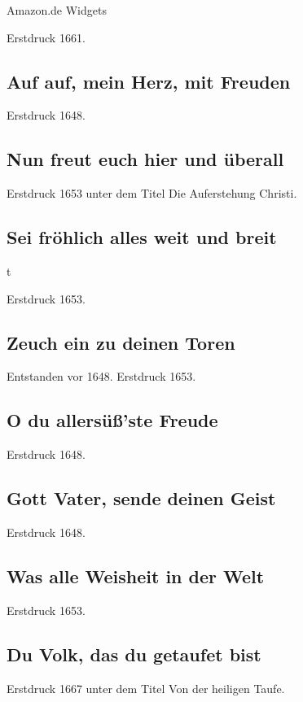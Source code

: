 Amazon.de Widgets 

Erstdruck 1661.

\subsection*{ Auf auf, mein Herz, mit Freuden}

Erstdruck 1648.

\subsection*{ Nun freut euch hier und überall}

Erstdruck 1653 unter dem Titel \frqq Die Auferstehung Christi\flqq .

\subsection*{ Sei fröhlich alles weit und breit}t

Erstdruck 1653.

\subsection*{ Zeuch ein zu deinen Toren}

Entstanden vor 1648. Erstdruck 1653.

\subsection*{ O du allersüß'ste Freude}

Erstdruck 1648.

\subsection*{ Gott Vater, sende deinen Geist}

Erstdruck 1648.

\subsection*{ Was alle Weisheit in der Welt}

Erstdruck 1653.

\subsection*{ Du Volk, das du getaufet bist}

Erstdruck 1667 unter dem Titel \frqq Von der heiligen Taufe\flqq .

